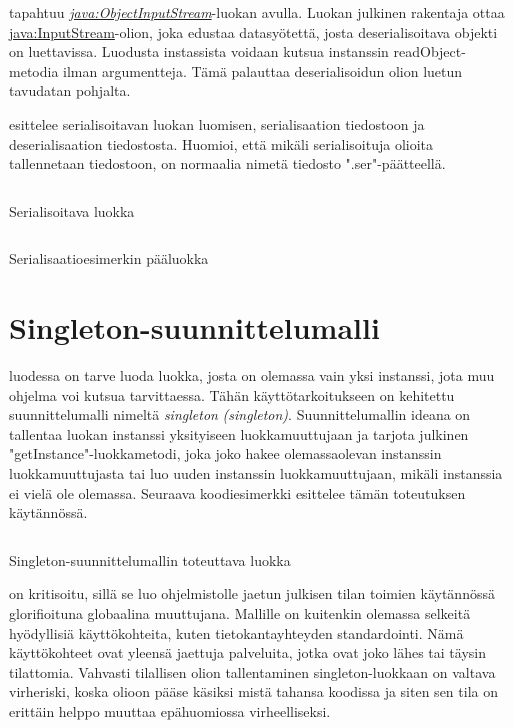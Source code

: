 \documentclass{tufte-book}
\newcommand{\eng}[1]{\textit{(#1)}}
\newcommand{\new}[1]{\textit{\gls{#1}}}
\newcommand{\neweng}[2]{\new{#1} \eng{#2}}
\newcommand{\java}[1]{\underline{\gls{java:#1}}}
\newcommand{\newjava}[1]{\textit{\java{#1}}}
\newcommand{\code}[3]{
\begin{listing}
    \inputminted{java}{OhjelmointiopasEsimerkit/src/#1/#2.java}
    \caption{#3}
    \label{Java-#1-#2}
\end{listing}
}
\begin{document}
 tapahtuu \newjava{ObjectInputStream}-luokan avulla. Luokan
julkinen rakentaja ottaa \java{InputStream}-olion, joka edustaa datasyötettä, josta
deserialisoitava objekti on luettavissa. Luodusta instassista voidaan kutsua instanssin
readObject-metodia ilman argumentteja. Tämä palauttaa deserialisoidun olion luetun tavudatan
pohjalta.

 esittelee serialisoitavan luokan luomisen, serialisaation
tiedostoon ja deserialisaation tiedostosta. Huomioi, että mikäli serialisoituja olioita
tallennetaan tiedostoon, on normaalia nimetä tiedosto ".ser"-päätteellä.

\code{week6/serializationexample}{SerializableData}{Serialisoitava luokka}
\code{week6/serializationexample}{SerializationExample}{Serialisaatioesimerkin pääluokka}


\chapter{Singleton-suunnittelumalli}
\label{singletonkappale}

 luodessa on tarve luoda luokka, josta on olemassa vain yksi
instanssi, jota muu ohjelma voi kutsua tarvittaessa. Tähän käyttötarkoitukseen on kehitettu
suunnittelumalli nimeltä \neweng{singleton}{singleton}. Suunnittelumallin ideana on tallentaa
luokan instanssi yksityiseen luokkamuuttujaan ja tarjota julkinen "getInstance"-luokkametodi,
joka joko hakee olemassaolevan instanssin luokkamuuttujasta tai luo uuden instanssin
luokkamuuttujaan, mikäli instanssia ei vielä ole olemassa. Seuraava koodiesimerkki esittelee
tämän toteutuksen käytännössä.

\code{week8}{SingletonExample}{Singleton-suunnittelumallin toteuttava luokka}

 on kritisoitu, sillä se luo ohjelmistolle jaetun
julkisen tilan toimien käytännössä glorifioituna globaalina muuttujana. Mallille on kuitenkin
olemassa selkeitä hyödyllisiä käyttökohteita, kuten tietokantayhteyden standardointi. Nämä
käyttökohteet ovat yleensä jaettuja palveluita, jotka ovat joko lähes tai täysin tilattomia.
Vahvasti tilallisen olion tallentaminen singleton-luokkaan on valtava virheriski, koska olioon
pääse käsiksi mistä tahansa koodissa ja siten sen tila on erittäin helppo muuttaa epähuomiossa
virheelliseksi.
\end{document}
